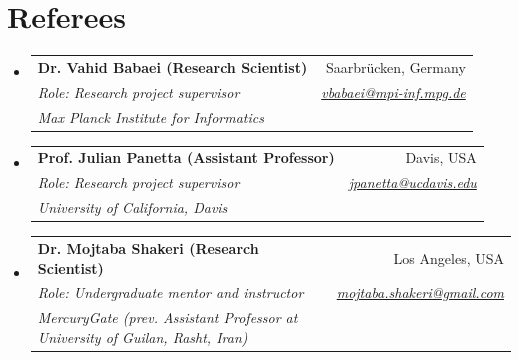 \documentclass[letterpaper,11pt]{article}
\makeatletter
\newcommand{\resumeSubheading}[5]{
  \item
    \begin{tabular*}{0.97\textwidth}{l@{\extracolsep{\fill}}r}
      \textbf{#1} & #2 \\ 
      \textit{\small#3} & \textit{\small #4} \\
      \textit{#5} & 
    \end{tabular*}\vspace{-5pt}
}
\newcommand{\resumeSubHeadingListStart}{\begin{itemize}[leftmargin=*]}
\newcommand{\resumeSubHeadingListEnd}{\end{itemize}}
\makeatother
\begin{document}
\section{Referees}
  \resumeSubHeadingListStart
    \resumeSubheading
      {Dr. Vahid Babaei (Research Scientist)}{Saarbr{\"u}cken, Germany}
       {Role: Research project supervisor}
      {\href{mailto:vbabaei@mpi-inf.mpg.de}{vbabaei@mpi-inf.mpg.de}}{Max Planck Institute for Informatics}

    \resumeSubheading
      {Prof. Julian Panetta (Assistant Professor)}{Davis, USA}
       {Role: Research project supervisor}
      {\href{mailto:jpanetta@ucdavis.edu}{jpanetta@ucdavis.edu}}{University of California, Davis}
    
    \resumeSubheading
      {Dr. Mojtaba Shakeri (Research Scientist)}{Los Angeles, USA}
       {Role: Undergraduate mentor and instructor}
      {\href{mailto:mojtaba.shakeri@gmail.com}{mojtaba.shakeri@gmail.com}}{MercuryGate (prev. Assistant Professor at University of Guilan, Rasht, Iran)}
  \resumeSubHeadingListEnd
\end{document}
